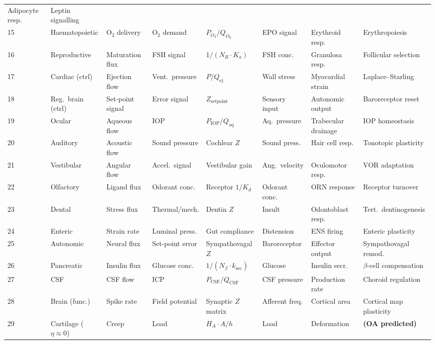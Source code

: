 \documentclass[aps,pre,twocolumn,superscriptaddress,floatfix]{revtex4-2}
\begin{document}
\begin{table}[t]
\begin{tabular}{llllllll}
Adipocyte resp. & Leptin signalling \\
15 & Haematopoietic & O$_2$ delivery & O$_2$ demand &
$P_{O_2}/Q_{O_2}$ & EPO signal &
Erythroid resp. & Erythropoiesis \\
16 & Reproductive & Maturation flux & FSH signal &
$1/(N_R \cdot K_a)$ & FSH conc. &
Granulosa resp. & Follicular selection \\
\midrule
17 & Cardiac (ctrl) & Ejection flow & Vent.\ pressure &
$P/Q_{\text{ej}}$ & Wall stress &
Myocardial strain & Laplace--Starling \\
18 & Reg.\ brain (ctrl) & Set-point signal &
Error signal & $Z_{\text{setpoint}}$ &
Sensory input & Autonomic output &
Baroreceptor reset \\
\midrule
19 & Ocular & Aqueous flow & IOP &
$P_{\text{IOP}}/Q_{\text{aq}}$ & Aq.\ pressure &
Trabecular drainage & IOP homeostasis \\
20 & Auditory & Acoustic flow & Sound pressure &
Cochlear $Z$ & Sound press. &
Hair cell resp. & Tonotopic plasticity \\
21 & Vestibular & Angular flow & Accel.\ signal &
Vestibular gain & Ang.\ velocity &
Oculomotor resp. & VOR adaptation \\
22 & Olfactory & Ligand flux & Odorant conc. &
Receptor $1/K_d$ & Odorant conc. &
ORN response & Receptor turnover \\
23 & Dental & Stress flux & Thermal/mech. &
Dentin $Z$ & Insult &
Odontoblast resp. & Tert.\ dentinogenesis \\
24 & Enteric & Strain rate & Luminal press. &
Gut compliance & Distension &
ENS firing & Enteric plasticity \\
25 & Autonomic & Neural flux & Set-point error &
Sympathovagal $Z$ & Baroreceptor &
Effector output & Sympathovagal remod. \\
26 & Pancreatic & Insulin flux & Glucose conc. &
$1/(N_\beta \cdot k_{\text{sec}})$ & Glucose &
Insulin secr. & $\beta$-cell compensation \\
27 & CSF & CSF flow & ICP &
$P_{\text{CSF}}/Q_{\text{CSF}}$ & CSF pressure &
Production rate & Choroid regulation \\
28 & Brain (func.) & Spike rate & Field potential &
Synaptic $Z$ matrix & Afferent freq. &
Cortical area & Cortical map plasticity \\
\midrule
29 & Cartilage ($\eta \approx 0$) & Creep & Load &
$H_A \cdot A/h$ & Load & Deformation &
\textbf{(OA predicted)} \\
\bottomrule
\end{tabular}
\end{table}
\end{document}
